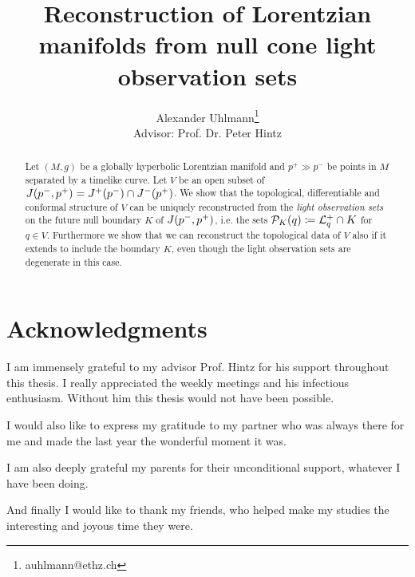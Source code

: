 \documentclass[12pt,notitlepage]{report}
\title{Reconstruction of Lorentzian manifolds from null cone light observation sets}
\author{Alexander Uhlmann\thanks{auhlmann@ethz.ch}\\
Advisor: Prof. Dr. Peter Hintz}
\begin{document}
\maketitle


\begin{abstract}
    Let $(M,g)$ be a globally hyperbolic Lorentzian manifold and $p^+\gg p^-$ be points in $M$ separated by a timelike curve. Let $V$ be an open subset of $J(p^-,p^+) = J^+(p^-)\cap J^-(p^+)$. We show that the topological, differentiable and conformal structure of $V$ can be uniquely reconstructed from the \emph{light observation sets} on the future null boundary $K$ of $J(p^-,p^+)$, i.e. the sets ${\mathcal{P}}_K(q) \coloneqq  {\mathcal{L}}^+_q \cap K$ for $q\in V$. Furthermore we show that we can reconstruct the topological data of $V$ also if it extends to include the boundary $K$, even though the light observation sets are degenerate in this case.
\end{abstract}

\chapter*{Acknowledgments}
I am immensely grateful to my advisor Prof. Hintz for his support throughout this thesis. I really appreciated the weekly meetings and his infectious enthusiasm. Without him this thesis would not have been possible. 

I would also like to express my gratitude to my partner who was always there for me and made the last year the wonderful moment it was.

I am also deeply grateful my parents for their unconditional support, whatever I have been doing.

And finally I would like to thank my friends, who helped make my studies the interesting and joyous time they were.

\tableofcontents

\end{document}
